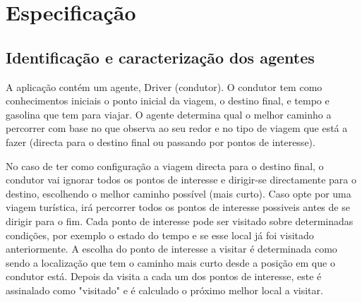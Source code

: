 \documentclass[15pt,a4paper]{article}
\begin{document}


\newpage
\section{Especificação}

\subsection{Identificação e caracterização dos agentes}
A aplicação contém um agente, Driver (condutor). O condutor tem como conhecimentos iniciais o ponto inicial da viagem, o destino final, e tempo e gasolina que tem para viajar. 
O agente determina qual o melhor caminho a percorrer com base no que observa ao seu redor e no tipo de viagem que está a fazer (directa para o destino final ou passando por pontos de interesse).

No caso de ter como configuração a viagem directa para o destino final, o condutor vai ignorar todos os pontos de interesse e dirigir-se directamente para o destino, escolhendo o melhor caminho possível (mais curto).
Caso opte por uma viagem turística, irá percorrer todos os pontos de interesse possiveis antes de se dirigir para o fim. Cada ponto de interesse pode ser visitado sobre determinadas condições, por exemplo o estado do tempo e se esse local já foi visitado anteriormente. A escolha do ponto de interesse a visitar é determinada como sendo a localização que tem o caminho mais curto desde a posição em que o condutor está. Depois da visita a cada um dos pontos de interesse, este é assinalado como "visitado" e é calculado o próximo melhor local a visitar.
\end{document}
